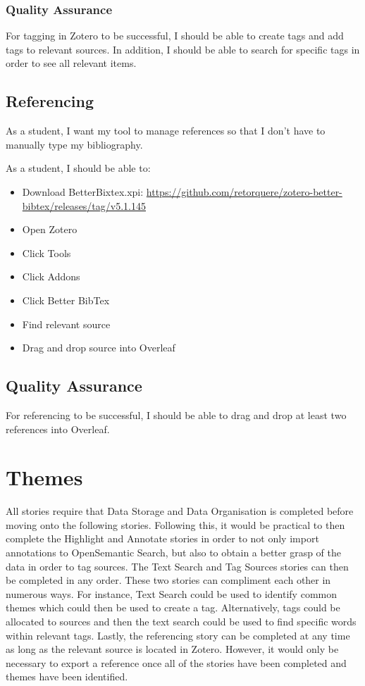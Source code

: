 \documentclass{article}
\begin{document}
\subsubsection{Quality Assurance}
For tagging in Zotero to be successful, I should be able to create tags and add tags to relevant sources. In addition, I should be able to search for specific tags in order to see all relevant items.

\subsection{Referencing}
As a student, I want my tool to manage references so that I don't have to manually type my bibliography.

As a student, I should be able to:
\begin{itemize}
    \item Download BetterBixtex.xpi: \href{https://github.com/retorquere/zotero-better-bibtex/releases/tag/v5.1.145}{https://github.com/retorquere/zotero-better-bibtex/releases/tag/v5.1.145}
    \item Open Zotero 
    \item Click Tools
    \item Click Addons
    \item Click Better BibTex 
    \item Find relevant source 
    \item Drag and drop source into Overleaf 
\end{itemize}

\subsection{Quality Assurance}
For referencing to be successful, I should be able to drag and drop at least two references into Overleaf.

  
\section{Themes}
All stories require that Data Storage and Data Organisation is completed before moving onto the following stories. Following this, it would be practical to then complete the Highlight and Annotate stories in order to not only import annotations to OpenSemantic Search, but also to obtain a better grasp of the data in order to tag sources. The Text Search and Tag Sources stories can then be completed in any order. These two stories can compliment each other in numerous ways. For instance, Text Search could be used to identify common themes which could then be used to create a tag. Alternatively, tags could be allocated to sources and then the text search could be used to find specific words within relevant tags. Lastly, the referencing story can be completed at any time as long as the relevant source is located in Zotero. However, it would only be necessary to export a reference once all of the stories have been completed and themes have been identified. 
\end{document}

